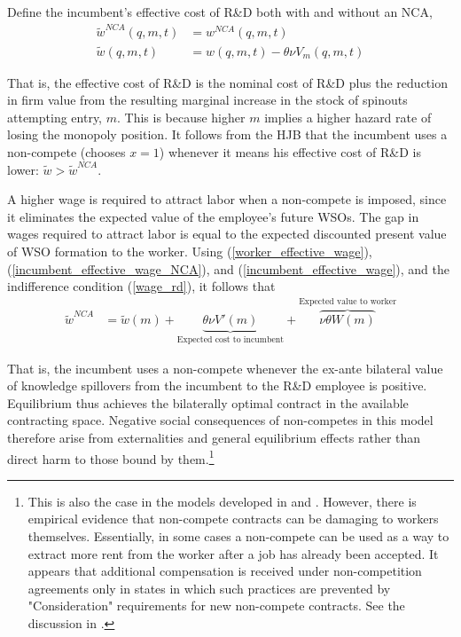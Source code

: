 \documentclass[12pt,english]{article}
\theoremstyle{remark}
\begin{document}
Define the incumbent's effective cost of R\&D both with and without an NCA,
\begin{align}
\tilde{w}^{NCA}(q,m,t) &= w^{NCA}(q,m,t)  \label{incumbent_effective_wage_NCA} \\
\tilde{w}(q,m,t) &= w(q,m,t) - \theta \nu V_m(q,m,t)  \label{incumbent_effective_wage}
\end{align}

That is, the effective cost of R\&D is the nominal cost of R\&D plus the reduction in firm value from the resulting marginal increase in the stock of spinouts attempting entry, $m$. This is because higher $m$ implies a higher hazard rate of losing the monopoly position. It follows from the HJB that the incumbent uses a non-compete (chooses $x = 1$) whenever it means his effective cost of R\&D is lower: $\tilde{w} > \tilde{w}^{NCA}$. 

A higher wage is required to attract labor when a non-compete is imposed, since it eliminates the expected value of the employee's future WSOs. The gap in wages required to attract labor is equal to the expected discounted present value of WSO formation to the worker. Using (\ref{worker_effective_wage}), (\ref{incumbent_effective_wage_NCA}), and (\ref{incumbent_effective_wage}), and the indifference condition (\ref{wage_rd}), it follows that
\begin{align}
\tilde{w}^{NCA} &= \tilde{w}(m) + \underbrace{\theta \nu V'(m)}_{\textrm{Expected cost to incumbent}} + \overbrace{\nu \theta W(m) }^{\textrm{Expected value to worker}}
\end{align} 

That is, the incumbent uses a non-compete whenever the ex-ante bilateral value of knowledge spillovers from the incumbent to the R\&D employee is positive. Equilibrium thus achieves the bilaterally optimal contract in the available contracting space. Negative social consequences of non-competes in this model therefore arise from externalities and general equilibrium effects rather than direct harm to those bound by them.\footnote{This is also the case in the models developed in \cite{baslandze_spinout_2019} and \cite{shi_restrictions_2018}. However, there is empirical evidence that non-compete contracts can be damaging to workers themselves. Essentially, in some cases a non-compete can be used as a way to extract more rent from the worker after a job has already been accepted. It appears that additional compensation is received under non-competition agreements only in states in which such practices are prevented by "Consideration" requirements for new non-compete contracts. See the discussion in \cite{starr_consider_2018}.}
\end{document}
